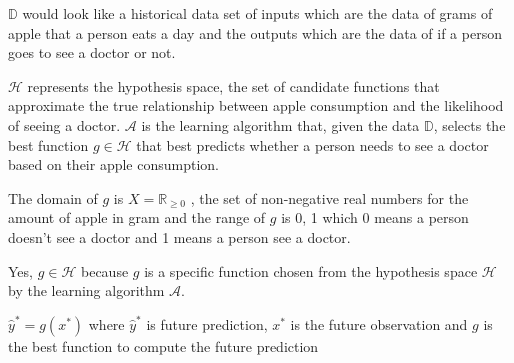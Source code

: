 \documentclass[12pt]{article}
\begin{document}
\begin{enumerate}

$\mathbb{D}$ would look like a historical data set of inputs which are the data of grams of apple that a person eats a day and the outputs which are the data of if a person goes to see a doctor or not. 


$\mathcal{H}$ represents the hypothesis space, the set of candidate functions that approximate the true relationship between apple consumption and the likelihood of seeing a doctor. $\mathcal{A}$ is the learning algorithm that, given the data $\mathbb{D}$, selects the best function $ g \in \mathcal{H} $ that best predicts whether a person needs to see a doctor based on their apple consumption.



The domain of  $g$  is  $X = \mathbb{R}_{\geq 0}$ , the set of non-negative real numbers for the amount of apple in gram and the range of $g$ is {0, 1} which 0 means a person doesn't see a doctor and 1 means a person see a doctor.


Yes,  $g \in \mathcal{H}$  because  $g$ is a specific function chosen from the hypothesis space $\mathcal{H}$ by the learning algorithm $\mathcal{A}$.



$\hat{y}^* = g(x^*)$ where $\hat{y}^*$ is future prediction, $x^*$ is the future observation  and $g$ is the best function to compute the future prediction




\end{enumerate}
\end{document}
